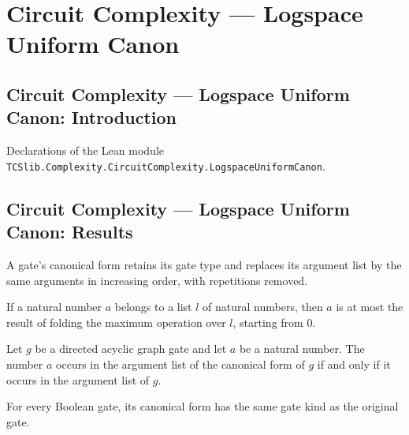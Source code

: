 \section{Circuit Complexity --- Logspace Uniform Canon}
\subsection*{Circuit Complexity --- Logspace Uniform Canon: Introduction}

Declarations of the Lean module \texttt{TCSlib.Complexity.CircuitComplexity.LogspaceUniformCanon}.

\subsection*{Circuit Complexity --- Logspace Uniform Canon: Results}

\begin{definition}
\label{BoolCircuit.DAGGate.canon}
\leanok
{}
A gate’s canonical form retains its gate type and replaces its argument list by the same
arguments in increasing order, with repetitions removed.
\end{definition}

\begin{lemma}
\label{BoolCircuit.DAGGate.le_foldr_max}
\leanok
{}
If a natural number $a$ belongs to a list $l$ of natural numbers, then $a$ is at most
the result of folding the maximum operation over $l$, starting from $0$.
\end{lemma}

\begin{lemma}
\label{BoolCircuit.DAGGate.mem_canon_args}
\leanok
{}
Let $g$ be a directed acyclic graph gate and let $a$ be a natural number. The number $a$
occurs in the argument list of the canonical form of $g$ if and only if it occurs in the
argument list of $g$.
\end{lemma}

\begin{lemma}
\label{BoolCircuit.DAGGate.canon_kind}
\leanok
{}
For every Boolean gate, its canonical form has the same gate kind as the original gate.
\end{lemma}


